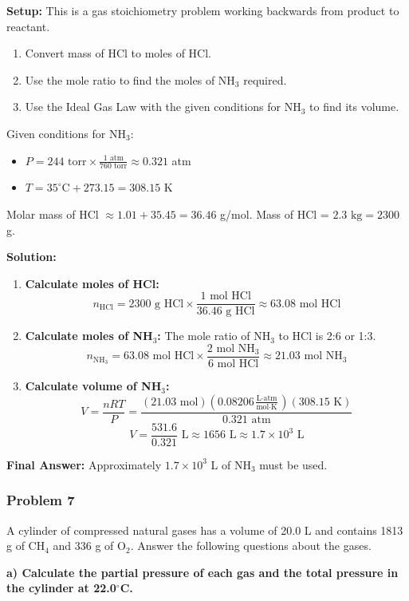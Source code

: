 \documentclass{article}
\begin{document}
\textbf{Setup:}
This is a gas stoichiometry problem working backwards from product to reactant.
\begin{enumerate}
    \item Convert mass of HCl to moles of HCl.
    \item Use the mole ratio to find the moles of NH$_3$ required.
    \item Use the Ideal Gas Law with the given conditions for NH$_3$ to find its volume.
\end{enumerate}
Given conditions for NH$_3$:
\begin{itemize}
    \item $P = 244 \text{ torr} \times \frac{1 \text{ atm}}{760 \text{ torr}} \approx 0.321$ atm
    \item $T = 35^{\circ}\text{C} + 273.15 = 308.15$ K
\end{itemize}
Molar mass of HCl $\approx 1.01 + 35.45 = 36.46$ g/mol.
Mass of HCl = $2.3 \text{ kg} = 2300$ g.

\textbf{Solution:}
\begin{enumerate}
    \item \textbf{Calculate moles of HCl:}
    \[ n_{\text{HCl}} = 2300 \text{ g HCl} \times \frac{1 \text{ mol HCl}}{36.46 \text{ g HCl}} \approx 63.08 \text{ mol HCl} \]
    \item \textbf{Calculate moles of NH$_3$:} The mole ratio of NH$_3$ to HCl is 2:6 or 1:3.
    \[ n_{\text{NH}_3} = 63.08 \text{ mol HCl} \times \frac{2 \text{ mol NH}_3}{6 \text{ mol HCl}} \approx 21.03 \text{ mol NH}_3 \]
    \item \textbf{Calculate volume of NH$_3$:}
    \[ V = \frac{nRT}{P} = \frac{(21.03 \text{ mol})(0.08206 \frac{\text{L} \cdot \text{atm}}{\text{mol} \cdot \text{K}})(308.15 \text{ K})}{0.321 \text{ atm}} \]
    \[ V = \frac{531.6}{0.321} \text{ L} \approx 1656 \text{ L} \approx 1.7 \times 10^3 \text{ L} \]
\end{enumerate}

\textbf{Final Answer:} Approximately $1.7 \times 10^3$ L of NH$_3$ must be used.

\subsubsection{Problem 7}
A cylinder of compressed natural gases has a volume of 20.0 L and contains 1813 g of CH$_4$ and 336 g of O$_2$. Answer the following questions about the gases.

\textbf{a) Calculate the partial pressure of each gas and the total pressure in the cylinder at 22.0$^{\circ}$C.}
\end{document}
